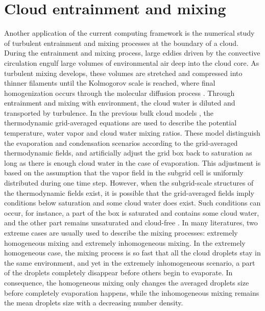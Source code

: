 \chapter{Cloud entrainment and mixing}
Another application of the current computing framework is the numerical study 
of turbulent entrainment and mixing processes at the boundary of a cloud. During the entrainment and mixing process, large eddies driven by the convective circulation engulf large volumes of environmental air deep into the cloud core. As turbulent mixing develops, these volumes are stretched and compressed into thinner filaments until the Kolmogorov scale is reached, where final homogenization occurs through the molecular diffusion process \cite{Burnet2007Observational}. Through entrainment and mixing with environment, the cloud water is diluted and transported by turbulence. In the previous bulk cloud models \cite{Grabowski1990Monotone}, the thermodynamic grid-averaged equations are used to describe the potential temperature, water vapor and cloud water mixing ratios. These model distinguish the evaporation and condensation scenarios according to the grid-averaged thermodynamic fields, and artificially adjust the grid box back to saturation as long as there is enough cloud water in the case of evaporation. This adjustment is based on the assumption that the vapor field in the subgrid cell is uniformly distributed during one time step. However, when the subgrid-scale structures of the thermodynamic fields exist, it is possible that the grid-averaged fields imply conditions below saturation and some cloud water does exist. Such conditions can occur, for instance, a part of the box is saturated and contains some cloud water, and the other part remains unsaturated and cloud-free \cite{Grabowski2007}. In many literatures\cite{Baker1980, Burnet2007Observational, Lehmann2009}, two extreme cases are usually used to describe the mixing processes: extremely homogeneous mixing and extremely inhomogeneous mixing. In the extremely homogeneous case, the mixing process is so fast that all the cloud droplets stay in the same environment, and yet in the extremely inhomogeneous scenario, a part of the droplets completely disappear before others begin to evaporate. In consequence, the homogeneous mixing only changes the averaged droplets size before completely evaporation happens, while the inhomogeneous mixing remains the mean droplets size with a decreasing number density.

